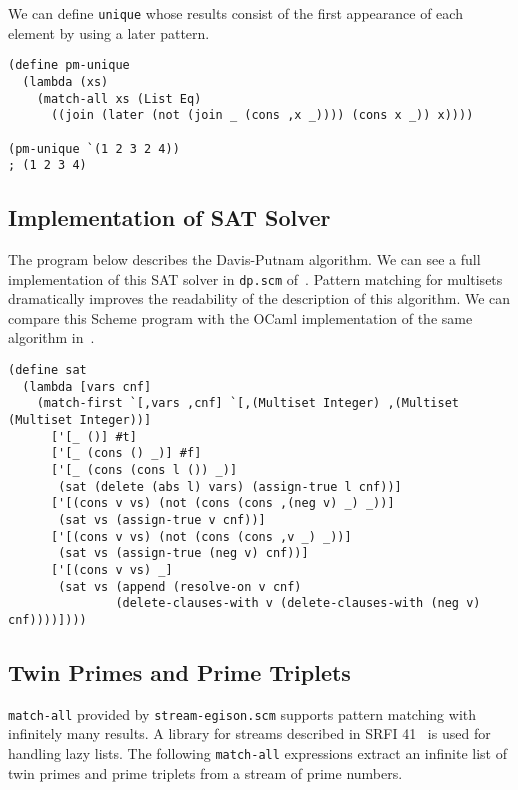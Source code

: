 \documentclass[acmlarge]{acmart}
\begin{document}
\noindent We can define \texttt{unique} whose results consist of the first appearance of each element by using a later pattern.

{\footnotesize
\begin{lstlisting}[language=egison]
(define pm-unique
  (lambda (xs)
    (match-all xs (List Eq)
      ((join (later (not (join _ (cons ,x _)))) (cons x _)) x))))

(pm-unique `(1 2 3 2 4))
; (1 2 3 4)
\end{lstlisting}
}

\subsection{Implementation of SAT Solver}

The program below describes the Davis-Putnam algorithm.
We can see a full implementation of this SAT solver in \texttt{dp.scm} of~\cite{egisonScheme}.
Pattern matching for multisets dramatically improves the readability of the description of this algorithm.
We can compare this Scheme program with the OCaml implementation of the same algorithm in~\cite{harrison2009handbook}.

\begin{lstlisting}[language=egison]
(define sat
  (lambda [vars cnf]
    (match-first `[,vars ,cnf] `[,(Multiset Integer) ,(Multiset (Multiset Integer))]
      ['[_ ()] #t]
      ['[_ (cons () _)] #f]
      ['[_ (cons (cons l ()) _)]
       (sat (delete (abs l) vars) (assign-true l cnf))]
      ['[(cons v vs) (not (cons (cons ,(neg v) _) _))]
       (sat vs (assign-true v cnf))]
      ['[(cons v vs) (not (cons (cons ,v _) _))]
       (sat vs (assign-true (neg v) cnf))]
      ['[(cons v vs) _]
       (sat vs (append (resolve-on v cnf)
               (delete-clauses-with v (delete-clauses-with (neg v) cnf))))])))
\end{lstlisting}


\subsection{Twin Primes and Prime Triplets}

\texttt{match-all} provided by \verb|stream-egison.scm| supports pattern matching with infinitely many results.
A library for streams described in SRFI 41~\cite{bewig2007scheme} is used for handling lazy lists.
The following \texttt{match-all} expressions extract an infinite list of twin primes and prime triplets from a stream of prime numbers.
\end{document}
